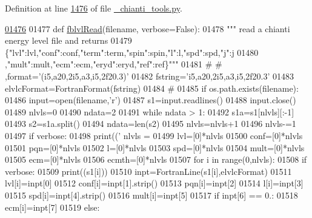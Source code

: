 Definition at line \hyperlink{__chianti__tools_8py_source_l01476}{1476} of file \hyperlink{__chianti__tools_8py_source}{\-\_\-chianti\-\_\-tools.\-py}.


\begin{DoxyCode}
\hypertarget{namespacepyneb_1_1utils_1_1__chianti__tools_l01476}{}\hyperlink{namespacepyneb_1_1utils_1_1__chianti__tools_a63235035cef376c49a1f4e81933452a6}{01476} 
01477 \textcolor{keyword}{def }\hyperlink{namespacepyneb_1_1utils_1_1__chianti__tools_a63235035cef376c49a1f4e81933452a6}{fblvlRead}(filename, verbose=False):
01478     \textcolor{stringliteral}{""" read a chianti energy level file and returns}
01479 \textcolor{stringliteral}{    \{"lvl":lvl,"conf":conf,"term":term,"spin":spin,"l":l,"spd":spd,"j":j}
01480 \textcolor{stringliteral}{    ,"mult":mult,"ecm":ecm,"eryd":eryd,"ref":ref\}"""}
01481 \textcolor{comment}{#        #  ,format='(i5,a20,2i5,a3,i5,2f20.3)'}
01482     fstring=\textcolor{stringliteral}{'i5,a20,2i5,a3,i5,2f20.3'}
01483     elvlcFormat=FortranFormat(fstring)
01484     \textcolor{comment}{#}
01485     \textcolor{keywordflow}{if} os.path.exists(filename):
01486         input=open(filename,\textcolor{stringliteral}{'}\textcolor{stringliteral}{r')}
01487 \textcolor{stringliteral}{        s1=input.readlines()}
01488 \textcolor{stringliteral}{        input.close()}
01489 \textcolor{stringliteral}{        nlvls=0}
01490 \textcolor{stringliteral}{        ndata=2}
01491 \textcolor{stringliteral}{        }\textcolor{keywordflow}{while} ndata > 1:
01492             s1a=s1[nlvls][:-1]
01493             s2=s1a.split()
01494             ndata=len(s2)
01495             nlvls=nlvls+1
01496         nlvls-=1
01497         \textcolor{keywordflow}{if} verbose:
01498             print((\textcolor{stringliteral}{' nlvls = %
01499         lvl=[0]*nlvls
01500         conf=[0]*nlvls
01501         pqn=[0]*nlvls
01502         l=[0]*nlvls
01503         spd=[0]*nlvls
01504         mult=[0]*nlvls
01505         ecm=[0]*nlvls
01506         ecmth=[0]*nlvls
01507         \textcolor{keywordflow}{for} i \textcolor{keywordflow}{in} range(0,nlvls):
01508             \textcolor{keywordflow}{if} verbose:
01509                 print((s1[i]))
01510             inpt=FortranLine(s1[i],elvlcFormat)
01511             lvl[i]=inpt[0]
01512             conf[i]=inpt[1].strip()
01513             pqn[i]=inpt[2]
01514             l[i]=inpt[3]
01515             spd[i]=inpt[4].strip()
01516             mult[i]=inpt[5]
01517             \textcolor{keywordflow}{if} inpt[6] == 0.:
01518                 ecm[i]=inpt[7]
01519             \textcolor{keywordflow}{else}:
}
\end{DoxyCode}
